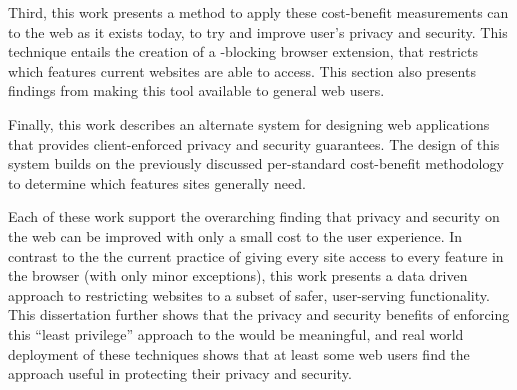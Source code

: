 Third, this work presents a method to apply these cost-benefit measurements can
to the web as it exists today, to try and improve user's privacy and security.
This technique entails the creation of a \WAPI-blocking browser extension,
that restricts which features current websites are able to access.  This section
also presents findings from making this tool available to general web users.

Finally, this work describes an alternate system for designing
web applications that provides client-enforced privacy and security guarantees.
The design of this system builds on the previously discussed per-standard
cost-benefit methodology to determine which \WAPI features sites generally need.

Each of these work support the overarching finding that privacy
and security on the web can be improved with only a small cost to the user
experience. In contrast to the the current practice of giving every site access
to every feature in the browser (with only minor exceptions), this work presents
a data driven approach to restricting websites to a subset of safer, user-serving
functionality.  This dissertation further shows that the privacy and security
benefits of enforcing this ``least privilege'' approach to the \WAPI would
be meaningful, and real world deployment of these techniques shows that at
least some web users find the approach useful in protecting their privacy and
security.
